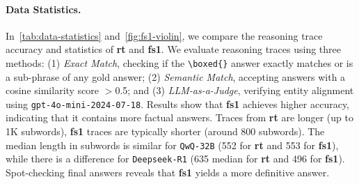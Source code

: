\documentclass[11pt]{article}
\newcommand{\rone}{\texttt{Deepseek-R1}}
\newcommand{\qwq}{\texttt{QwQ-32B}}
\newcommand{\dataset}{\textbf{fs1}}
\begin{document}
\paragraph{Data Statistics.} In~\cref{tab:data-statistics} and~\cref{fig:fs1-violin}, we compare the reasoning trace accuracy and statistics of \textbf{rt} and \dataset{}.
We evaluate reasoning traces using three methods: (1) \textit{Exact Match}, checking if the \verb|\boxed{}| answer exactly matches or is a sub-phrase of any gold answer; (2) \textit{Semantic Match}, accepting answers with a cosine similarity score $>$0.5; and (3) \textit{LLM-as-a-Judge}, verifying entity alignment using \texttt{gpt-4o-mini-2024-07-18}. 
Results show that \dataset{} achieves higher accuracy, indicating that it contains more factual answers.
Traces from \textbf{rt} are longer (up to 1K subwords), \dataset{} traces are typically shorter (around 800 subwords). The median length in subwords is similar for \qwq{} (552 for \textbf{rt} and 553 for \dataset{}), while there is a difference for \rone{} (635 median for \textbf{rt} and 496 for \dataset{}). Spot-checking final answers reveals that \dataset{} yields a more definitive answer.
\end{document}

